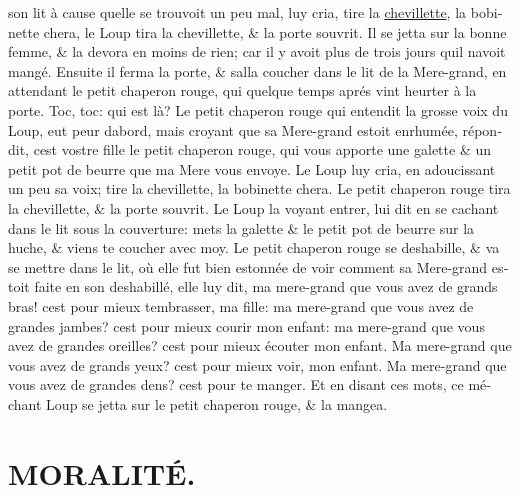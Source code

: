 \documentclass[14pt,a4paper]{memoir}
\newcommand{\ul}[1]{\uline{#1}}
\newcommand{\notesection}[1]{%
  \addtonotes{\protect\par\protect\vspace{2ex}\protect\noindent\textbf{#1}\protect\par\protect\vspace{1ex}}%
}
\begin{document}
{{\begin{otherlanguage}{french}
son lit à cause qu\textquotesingle elle se trouvoit un peu mal, luy
cria, tire la \ul{chevillette}, la bobinette chera, le Loup tira la
chevillette, \& la porte s\textquotesingle ouvrit. Il se jetta sur la
bonne femme, \& la devora en moins de rien; car il y avoit plus de trois
jours qu\textquotesingle il n\textquotesingle avoit mangé. Ensuite il
ferma la porte, \& s\textquotesingle alla coucher dans le lit de la
Mere-grand, en attendant le petit chaperon rouge, qui quelque temps
aprés vint heurter à la porte. Toc, toc: qui est là? Le petit chaperon
rouge qui entendit la grosse voix du Loup, eut peur
d\textquotesingle abord, mais croyant que sa Mere-grand estoit enrhumée,
répondit, c\textquotesingle est vostre fille le petit chaperon rouge,
qui vous apporte une galette \& un petit pot de beurre que ma Mere vous
envoye. Le Loup luy cria, en adoucissant un peu sa voix; tire la
chevillette, la bobinette chera. Le petit chaperon rouge tira la
chevillette, \& la porte s\textquotesingle ouvrit. Le Loup la voyant
entrer, lui dit en se cachant dans le lit sous la couverture: mets la
galette \& le petit pot de beurre sur la huche, \& viens te coucher avec
moy. Le petit chaperon rouge se deshabille, \& va se mettre dans le lit,
où elle fut bien estonnée de voir comment sa Mere-grand estoit faite en
son deshabillé, elle luy dit, ma mere-grand que vous avez de grands
bras! c\textquotesingle est pour mieux t\textquotesingle embrasser, ma
fille: ma mere-grand que vous avez de grandes jambes?
c\textquotesingle est pour mieux courir mon enfant: ma mere-grand que
vous avez de grandes oreilles? c\textquotesingle est pour mieux écouter
mon enfant. Ma mere-grand que vous avez de grands yeux?
c\textquotesingle est pour mieux voir, mon enfant. Ma mere-grand que
vous avez de grandes dens? c\textquotesingle est pour te manger. Et en
disant ces mots, ce méchant Loup se jetta sur le petit chaperon rouge,
\& la mangea. \\

\section{MORALITÉ.}
\notesection{MORALITÉ.}


\end{otherlanguage}}}
\end{document}
